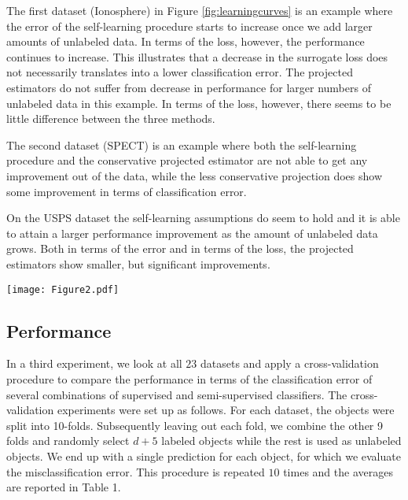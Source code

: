 \documentclass{article}
\begin{document}
The first dataset (Ionosphere) in Figure \ref{fig:learningcurves} is an example where the error of the self-learning procedure starts to increase once we add larger amounts of unlabeled data. In terms of the loss, however, the performance continues to increase. This illustrates that a decrease in the surrogate loss does not necessarily translates into a lower classification error. The projected estimators do not suffer from decrease in performance for larger numbers of unlabeled data in this example. In terms of the loss, however, there seems to be little difference between the three methods.

The second dataset (SPECT) is an example where both the self-learning procedure and the conservative projected estimator are not able to get any improvement out of the data, while the less conservative projection does show some improvement in terms of classification error.

On the USPS dataset the self-learning assumptions do seem to hold and it is able to attain a larger performance improvement as the amount of unlabeled data grows. Both in terms of the error and in terms of the loss, the projected estimators show smaller, but significant improvements.

\begin{figure*}
\centering
\texttt{[image: Figure2.pdf]}
\caption{Learning curves in terms of classification errors and quadratic loss on the test set for increasing numbers of \emph{unlabeled} data on three illustrative datasets. The lines indicate average errors respectively losses on the test set, averaged over $1000$ repeats. The shaded bars indicate standard errors around the mean. The slight increase in the standard error for larger amounts of unlabeled data, which is especially apparent for the supervised curve, is caused by the decreasing size of the test set as one increases the number of objects used as unlabeled training data.}
\label{fig:learningcurves}
\end{figure*}

\subsection{Performance}
In a third experiment, we look at all $23$ datasets and apply a cross-validation procedure to compare the performance in terms of the classification error of several combinations of supervised and semi-supervised classifiers. The cross-validation experiments were set up as follows. For each dataset, the objects were split into 10-folds. Subsequently leaving out each fold, we combine the other 9 folds and randomly select $d+5$ labeled objects while the rest is used as unlabeled objects. We end up with a single prediction for each object, for which we evaluate the misclassification error. This procedure is repeated $10$ times and the averages are reported in Table 1.
\end{document}
